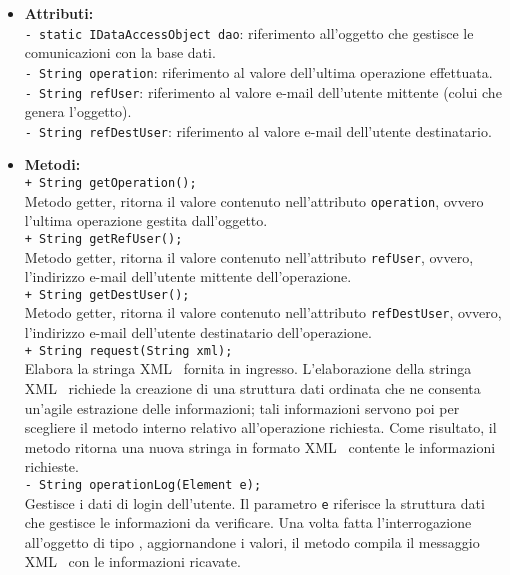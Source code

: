 {{\begin{sloppypar}
{{{\begin{itemize}
				\item[] \textbf{Attributi:}{\\
					\texttt{- static IDataAccessObject dao}: riferimento all'oggetto  che gestisce le comunicazioni con la base dati.\\
					
					\texttt{- String operation}: riferimento al valore dell'ultima operazione effettuata.\\
					
					\texttt{- String refUser}: riferimento al valore e-mail dell'utente mittente (colui che genera l'oggetto).\\
					
					\texttt{- String refDestUser}: riferimento al valore e-mail dell'utente destinatario.\\
					}
			
				\item[] \textbf{Metodi:}{\\
					\texttt{+ String getOperation();}\\
					Metodo getter, ritorna il valore contenuto nell'attributo \texttt{operation}, ovvero l'ultima operazione gestita dall'oggetto.\\	
					
					\texttt{+ String getRefUser();}\\
					Metodo getter, ritorna il valore contenuto nell'attributo \texttt{refUser}, ovvero, l'indirizzo e-mail dell'utente mittente dell'operazione.\\
					
					\texttt{+ String getDestUser();}\\
					Metodo getter, ritorna il valore contenuto nell'attributo \texttt{refDestUser}, ovvero, l'indirizzo e-mail dell'utente destinatario dell'operazione.\\
					
					\texttt{+ String request(String xml);}\\
					Elabora la stringa XML\g~ fornita in ingresso.
					L'elaborazione della stringa XML\g~ richiede la creazione di una struttura dati ordinata che ne consenta un'agile estrazione delle informazioni; tali informazioni servono poi per scegliere il metodo interno relativo all'operazione richiesta.
					Come risultato, il metodo ritorna una nuova stringa in formato XML\g~ contente le informazioni richieste.\\
					
					\texttt{- String operationLog(Element e);}\\
					Gestisce i dati di login dell'utente. Il parametro \texttt{e} riferisce la struttura dati che gestisce le informazioni da verificare.
					Una volta fatta l'interrogazione all'oggetto di tipo , aggiornandone i valori, il metodo compila il messaggio XML\g~ con le informazioni ricavate.\\
					
}
\end{itemize}}}}
\end{sloppypar}}}
